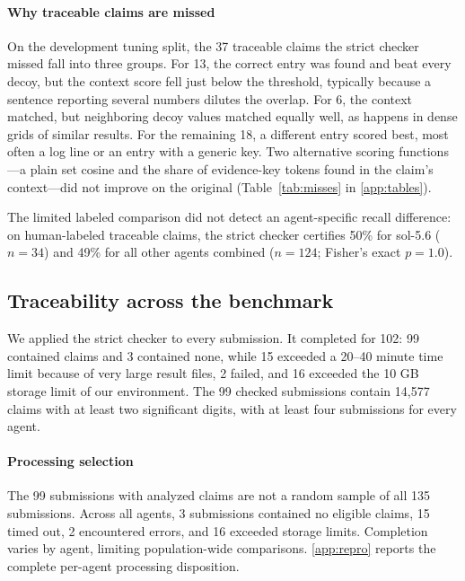 \documentclass[preprint,12pt,authoryear]{elsarticle}
\begin{document}
\paragraph{Why traceable claims are missed} On the development tuning split, the 37 traceable claims the strict checker missed fall into three groups. For 13, the correct entry was found and beat every decoy, but the context score fell just below the threshold, typically because a sentence reporting several numbers dilutes the overlap. For 6, the context matched, but neighboring decoy values matched equally well, as happens in dense grids of similar results. For the remaining 18, a different entry scored best, most often a log line or an entry with a generic key. Two alternative scoring functions---a plain set cosine and the share of evidence-key tokens found in the claim's context---did not improve on the original (Table~\ref{tab:misses} in \ref{app:tables}).

The limited labeled comparison did not detect an agent-specific recall difference: on human-labeled traceable claims, the strict checker certifies 50\% for sol-5.6 ($n=34$) and 49\% for all other agents combined ($n=124$; Fisher's exact $p=1.0$).

\subsection{Traceability across the benchmark}\label{sec:res-bench}

We applied the strict checker to every submission. It completed for 102: 99 contained claims and 3 contained none, while 15 exceeded a 20--40 minute time limit because of very large result files, 2 failed, and 16 exceeded the 10 GB storage limit of our environment. The 99 checked submissions contain 14,577 claims with at least two significant digits, with at least four submissions for every agent.

\paragraph{Processing selection} The 99 submissions with analyzed claims are not a random sample of all 135 submissions. Across all agents, 3 submissions contained no eligible claims, 15 timed out, 2 encountered errors, and 16 exceeded storage limits. Completion varies by agent, limiting population-wide comparisons. \ref{app:repro} reports the complete per-agent processing disposition.
\end{document}
